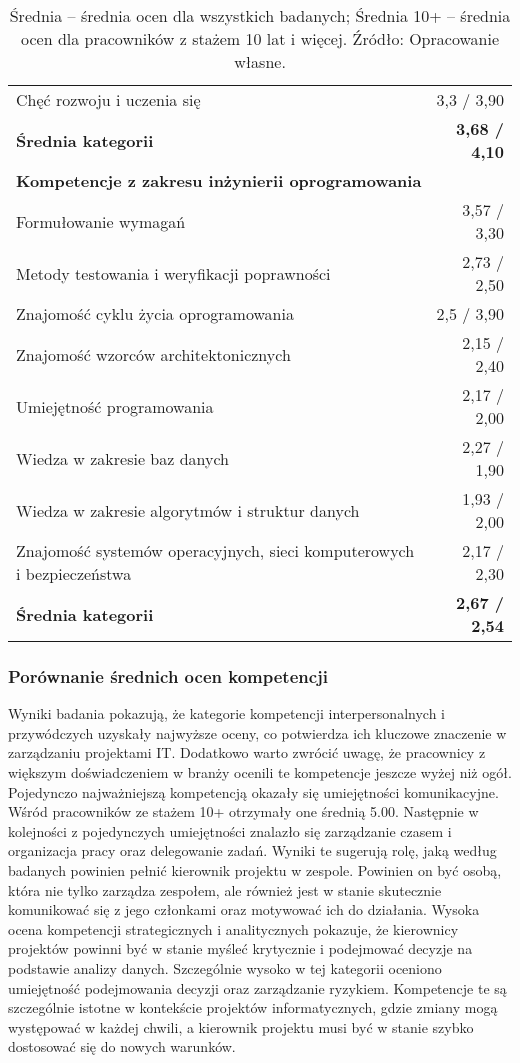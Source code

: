 \begin{table}[htbp]
\begin{tabular}{p{9cm} r}
Chęć rozwoju i uczenia się & 3{,}3 / 3{,}90 \\
\textbf{Średnia kategorii} & \textbf{3{,}68 / 4{,}10} \\
\midrule
\multicolumn{2}{l}{\textbf{Kompetencje z zakresu inżynierii oprogramowania}} \\
Formułowanie wymagań & 3{,}57 / 3{,}30 \\
Metody testowania i weryfikacji poprawności & 2{,}73 / 2{,}50 \\
Znajomość cyklu życia oprogramowania & 2{,}5 / 3{,}90 \\
Znajomość wzorców architektonicznych & 2{,}15 / 2{,}40 \\
Umiejętność programowania & 2{,}17 / 2{,}00 \\
Wiedza w zakresie baz danych & 2{,}27 / 1{,}90 \\
Wiedza w zakresie algorytmów i struktur danych & 1{,}93 / 2{,}00 \\
Znajomość systemów operacyjnych, sieci komputerowych i bezpieczeństwa & 2{,}17 / 2{,}30 \\
\textbf{Średnia kategorii} & \textbf{2{,}67 / 2{,}54} \\
\bottomrule
\end{tabular}
\caption*{Średnia – średnia ocen dla wszystkich badanych; Średnia 10+ – średnia ocen dla pracowników z stażem 10 lat i więcej. Źródło: Opracowanie własne.}
\end{table}

\subsubsection{Porównanie średnich ocen kompetencji}

Wyniki badania pokazują, że kategorie kompetencji interpersonalnych i przywódczych uzyskały najwyższe oceny, co potwierdza ich kluczowe znaczenie w zarządzaniu projektami IT. Dodatkowo warto zwrócić uwagę, że pracownicy z większym doświadczeniem w branży ocenili te kompetencje jeszcze wyżej niż ogół. Pojedynczo najważniejszą kompetencją okazały się umiejętności komunikacyjne. Wśród pracowników ze stażem 10+ otrzymały one średnią 5.00. Następnie w kolejności z pojedynczych umiejętności znalazło się zarządzanie czasem i organizacja pracy oraz delegowanie zadań. Wyniki te sugerują rolę, jaką według badanych powinien pełnić kierownik projektu w zespole. Powinien on być osobą, która nie tylko zarządza zespołem, ale również jest w stanie skutecznie komunikować się z jego członkami oraz motywować ich do działania. Wysoka ocena kompetencji strategicznych i analitycznych pokazuje, że kierownicy projektów powinni być w stanie myśleć krytycznie i podejmować decyzje na podstawie analizy danych. Szczególnie wysoko w tej kategorii oceniono umiejętność podejmowania decyzji oraz zarządzanie ryzykiem. Kompetencje te są szczególnie istotne w kontekście projektów informatycznych, gdzie zmiany mogą występować w każdej chwili, a kierownik projektu musi być w stanie szybko dostosować się do nowych warunków.

